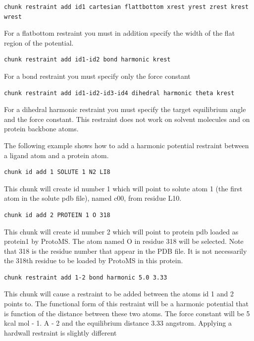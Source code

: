 \documentclass[letterpaper,10pt,english]{manual}
\begin{document}
\begin{Verbatim}[commandchars=@\[\]]
chunk restraint add id1 cartesian flattbottom xrest yrest zrest krest wrest
\end{Verbatim}

For a flatbottom restraint you must in addition specify the width of the flat region of the potential.
\begin{Verbatim}[commandchars=@\[\]]
chunk restraint add id1-id2 bond harmonic krest
\end{Verbatim}

For a bond restraint you must specify only the force constant
\begin{Verbatim}[commandchars=@\[\]]
chunk restraint add id1-id2-id3-id4 dihedral harmonic theta krest
\end{Verbatim}

For a dihedral harmonic restraint you must specify the target equilibrium angle and the force constant. This restraint does not work on solvent molecules and on protein backbone atoms.

The following example shows how to add a harmonic potential restraint between a ligand atom and a protein atom.

\begin{Verbatim}[commandchars=@\[\]]
chunk id add 1 SOLUTE 1 N2 LI8
\end{Verbatim}

This chunk will create id number 1 which will point to solute atom 1 (the first atom in the solute pdb file), named c00, from residue L10.

\begin{Verbatim}[commandchars=@\[\]]
chunk id add 2 PROTEIN 1 O 318
\end{Verbatim}

This chunk will create id number 2 which will point to protein pdb loaded as protein1 by ProtoMS. The atom named O in residue 318 will be selected. Note that 318 is the residue number that appear in the PDB file. It is not necessarily the 318th residue to be loaded by ProtoMS in this protein.

\begin{Verbatim}[commandchars=@\[\]]
chunk restraint add 1-2 bond harmonic 5.0 3.33
\end{Verbatim}

This chunk will cause a restraint to be added between the atoms id 1 and 2 points to. The functional form of this restraint will be a harmonic potential that is function of the distance between these two atoms. The force constant will be 5 kcal mol - 1. A - 2 and the equilibrium distance 3.33 angstrom.
Applying a hardwall restraint is slightly different
\end{document}
